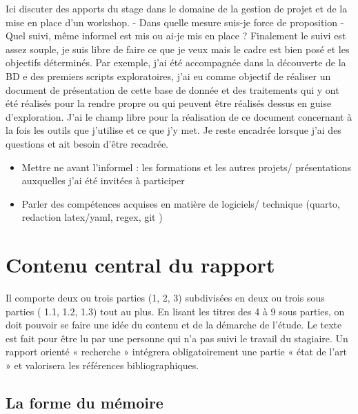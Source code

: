\documentclass[
  a4paper,
]{scrbook}
\begin{document}
Ici discuter des apports du stage dans le domaine de la gestion de
projet et de la mise en place d'un workshop. - Dans quelle mesure
suis-je force de proposition - Quel suivi, même informel est mis ou
ai-je mis en place ? Finalement le suivi est assez souple, je suis libre
de faire ce que je veux mais le cadre est bien posé et les objectifs
déterminés. Par exemple, j'ai été accompagnée dans la découverte de la
BD e des premiers scripts exploratoires, j'ai eu comme objectif de
réaliser un document de présentation de cette base de donnée et des
traitements qui y ont été réalisés pour la rendre propre ou qui peuvent
être réalisés dessus en guise d'exploration. J'ai le champ libre pour la
réalisation de ce document concernant à la fois les outils que j'utilise
et ce que j'y met. Je reste encadrée lorsque j'ai des questions et ait
besoin d'être recadrée.

\begin{itemize}
\item
  Mettre ne avant l'informel : les formations et les autres projets/
  présentations auxquelles j'ai été invitées à participer
\item
  Parler des compétences acquises en matière de logiciels/ technique
  (quarto, redaction latex/yaml, regex, git )
\end{itemize}


\hypertarget{contenu-central-du-rapport}{%
\chapter{Contenu central du rapport}\label{contenu-central-du-rapport}}

Il comporte deux ou trois parties (1, 2, 3) subdivisées en deux ou trois
sous parties ( 1.1, 1.2, 1.3) tout au plus. En lisant les titres des 4 à
9 sous parties, on doit pouvoir se faire une idée du contenu et de la
démarche de l'étude. Le texte est fait pour être lu par une personne qui
n'a pas suivi le travail du stagiaire. Un rapport orienté « recherche »
intégrera obligatoirement une partie « état de l'art » et valorisera les
références bibliographiques.

\hypertarget{la-forme-du-muxe9moire}{%
\section{La forme du mémoire}\label{la-forme-du-muxe9moire}}
\end{document}
